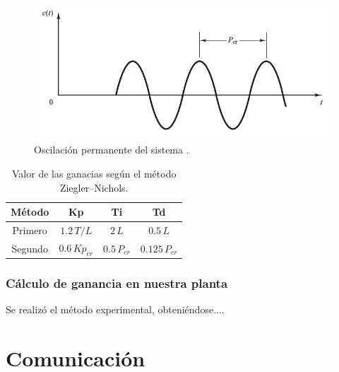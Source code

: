\begin{figure}[ht]
 \centering
 \includegraphics[scale=0.5]{Cap4-ProgramacionPLC/images/segundometodo.png}
 \caption{Oscilación permanente del sistema \cite{bib:Ogata}.}
 \label{fig:segundometodo}
\end{figure}

\begin{table}[!t]
\renewcommand{\arraystretch}{1.3}
\centering
\begin{tabular}{c||c||c |c}
\hline
\bfseries Método & \bfseries Kp  & \bfseries Ti & \bfseries Td\\
\hline \hline
Primero &  $ 1.2 \, {T}/{L}$ & $2 \, L $ & $ 0.5 \, L $\\
\hline
Segundo &  $0.6 \,Kp_{cr}  $ & $ 0.5 \, P_{cr}$ & $0.125 \, P_{cr} $\\
\hline
\end{tabular}
\caption{Valor de las ganacias según el método Ziegler–Nichols.}
\label{tab:valorganancias}
\end{table}

\subsubsection{Cálculo de ganancia en nuestra planta}

Se realizó el método experimental, obteniéndose....

\section{Comunicación}
\label{sec:Comunicacion}

